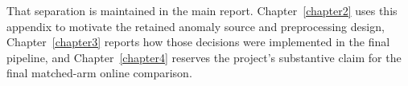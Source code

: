 \begin{appendices}
That separation is maintained in the main report. Chapter~\ref{chapter2} uses this appendix to motivate the retained anomaly source and preprocessing design, Chapter~\ref{chapter3} reports how those decisions were implemented in the final pipeline, and Chapter~\ref{chapter4} reserves the project's substantive claim for the final matched-arm online comparison.




%
%



\end{appendices}
